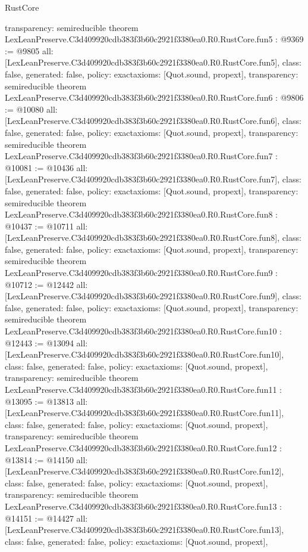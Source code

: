 \begin{lexlean}{RustCore}
\begin{coremodule}
{  transparency: semireducible
}
theorem LexLeanPreserve.C3d409920cdb383f3b60c2921f3380ea0.R0.RustCore.fun5 : @9369 := @9805 {
  all: [LexLeanPreserve.C3d409920cdb383f3b60c2921f3380ea0.R0.RustCore.fun5],
  class: false,
  generated: false,
  policy: exact{axioms: [Quot.sound, propext]},
  transparency: semireducible
}
theorem LexLeanPreserve.C3d409920cdb383f3b60c2921f3380ea0.R0.RustCore.fun6 : @9806 := @10080 {
  all: [LexLeanPreserve.C3d409920cdb383f3b60c2921f3380ea0.R0.RustCore.fun6],
  class: false,
  generated: false,
  policy: exact{axioms: [Quot.sound, propext]},
  transparency: semireducible
}
theorem LexLeanPreserve.C3d409920cdb383f3b60c2921f3380ea0.R0.RustCore.fun7 : @10081 := @10436 {
  all: [LexLeanPreserve.C3d409920cdb383f3b60c2921f3380ea0.R0.RustCore.fun7],
  class: false,
  generated: false,
  policy: exact{axioms: [Quot.sound, propext]},
  transparency: semireducible
}
theorem LexLeanPreserve.C3d409920cdb383f3b60c2921f3380ea0.R0.RustCore.fun8 : @10437 := @10711 {
  all: [LexLeanPreserve.C3d409920cdb383f3b60c2921f3380ea0.R0.RustCore.fun8],
  class: false,
  generated: false,
  policy: exact{axioms: [Quot.sound, propext]},
  transparency: semireducible
}
theorem LexLeanPreserve.C3d409920cdb383f3b60c2921f3380ea0.R0.RustCore.fun9 : @10712 := @12442 {
  all: [LexLeanPreserve.C3d409920cdb383f3b60c2921f3380ea0.R0.RustCore.fun9],
  class: false,
  generated: false,
  policy: exact{axioms: [Quot.sound, propext]},
  transparency: semireducible
}
theorem LexLeanPreserve.C3d409920cdb383f3b60c2921f3380ea0.R0.RustCore.fun10 : @12443 := @13094 {
  all: [LexLeanPreserve.C3d409920cdb383f3b60c2921f3380ea0.R0.RustCore.fun10],
  class: false,
  generated: false,
  policy: exact{axioms: [Quot.sound, propext]},
  transparency: semireducible
}
theorem LexLeanPreserve.C3d409920cdb383f3b60c2921f3380ea0.R0.RustCore.fun11 : @13095 := @13813 {
  all: [LexLeanPreserve.C3d409920cdb383f3b60c2921f3380ea0.R0.RustCore.fun11],
  class: false,
  generated: false,
  policy: exact{axioms: [Quot.sound, propext]},
  transparency: semireducible
}
theorem LexLeanPreserve.C3d409920cdb383f3b60c2921f3380ea0.R0.RustCore.fun12 : @13814 := @14150 {
  all: [LexLeanPreserve.C3d409920cdb383f3b60c2921f3380ea0.R0.RustCore.fun12],
  class: false,
  generated: false,
  policy: exact{axioms: [Quot.sound, propext]},
  transparency: semireducible
}
theorem LexLeanPreserve.C3d409920cdb383f3b60c2921f3380ea0.R0.RustCore.fun13 : @14151 := @14427 {
  all: [LexLeanPreserve.C3d409920cdb383f3b60c2921f3380ea0.R0.RustCore.fun13],
  class: false,
  generated: false,
  policy: exact{axioms: [Quot.sound, propext]},
}
\end{coremodule}
\end{lexlean}
